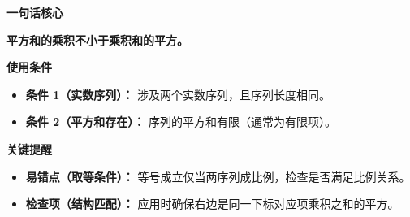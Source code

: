 \begin{summarybox}
\textbf{\textcolor{CSummary}{一句话核心}}

\textbf{平方和的乘积不小于乘积和的平方。}

\medskip
\textbf{\textcolor{CSummary}{使用条件}}
\begin{itemize}[leftmargin=*, itemsep=0.5em, topsep=0.4em]
    \item \textbf{条件 1（实数序列）：} 涉及两个实数序列，且序列长度相同。
    \item \textbf{条件 2（平方和存在）：} 序列的平方和有限（通常为有限项）。
\end{itemize}

\medskip
\textbf{\textcolor{CSummary}{关键提醒}}
\begin{itemize}[leftmargin=*, itemsep=0.5em, topsep=0.4em]
    \item \textbf{易错点（取等条件）：} 等号成立仅当两序列成比例，检查是否满足比例关系。
    \item \textbf{检查项（结构匹配）：} 应用时确保右边是同一下标对应项乘积之和的平方。
\end{itemize}
\end{summarybox}
